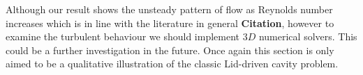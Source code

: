 Although our result shows the unsteady pattern of flow as Reynolds number increases which is in line with the literature in general \textbf{Citation}, however to examine the turbulent behaviour we should implement $3D$ numerical solvers. This could be a further investigation in the future. Once again this section is only aimed to be a qualitative illustration of the classic Lid-driven cavity problem. 
